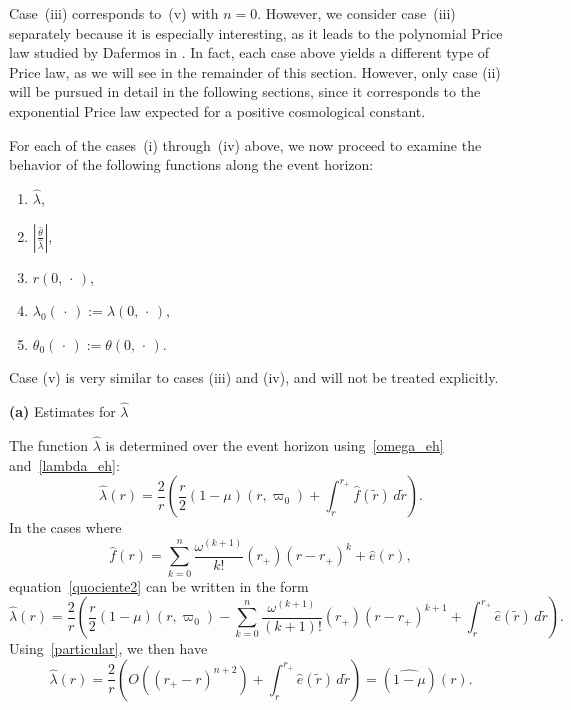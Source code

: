 \documentclass[a4paper,11pt,oneside,reqno]{amsart}
\begin{document}
Case~(iii) corresponds to~(v) with $n=0$. However, we consider case~(iii) separately because it is especially interesting, as it leads to the polynomial Price law studied by Dafermos in \cite{Dafermos2}. In fact, each case above yields a different type of Price law, as we will see in the remainder of this section. However, only case (ii) will be pursued in detail in the following sections, since it corresponds to the exponential Price law expected for a positive cosmological constant.




For each of the cases~(i) through~(iv) above, we now proceed to examine the behavior of the following functions along the event horizon:
\begin{enumerate}[{\bf (a)}]
\item $\hat{\lambda}$,
\item $\left|\frac{\hat{\theta}}{\hat{\lambda}}\right|$,
\item $r(0,\,\cdot\,)$,
\item $\lambda_0(\,\cdot\,):=\lambda(0,\,\cdot\,)$,
\item $\theta_0(\,\cdot\,):=\theta(0,\,\cdot\,)$.
\end{enumerate}
Case (v) is very similar to cases (iii) and (iv), and will not be treated explicitly.

\bigskip


\begin{center}
{\bf (a)} Estimates for $\hat{\lambda}$
\end{center}

The function $\hat{\lambda}$ is determined over the event horizon
using~\eqref{omega_eh} and~\eqref{lambda_eh}: 
\begin{equation}\label{quociente2}
\hat{\lambda}(r)=
\frac{2}{r}\left(
\frac{r}{2}(1-\mu)(r,\varpi_0)+\int_r^{r_+}\hat f(\tilde r)\,d\tilde r\right).
\end{equation}
In the cases where 
\begin{equation}
\label{obama}
\hat f(r)=\sum_{k=0}^n\frac{\omega^{(k+1)}}{k!}(r_+)(r-r_+)^k + \hat{e}(r),
\end{equation}
equation~\eqref{quociente2} can be written in the form
$$
\hat{\lambda}(r)=
\frac{2}{r}\left(
\frac{r}{2}(1-\mu)(r,\varpi_0)-\sum_{k=0}^n\frac{\omega^{(k+1)}}{(k+1)!}(r_+)(r-r_+)^{k+1}+\int_r^{r_+}\hat e(\tilde r)\,d\tilde r\right).
$$
Using~\eqref{particular}, we then have 
\begin{equation}
\label{quociente3}
\hat\lambda(r)=\frac{2}{r}\left(O((r_+-r)^{n+2})+
\int_r^{r_+}\hat e(\tilde r)\,d\tilde r\right)=(\widehat{1-\mu})(r).
\end{equation}
\end{document}

